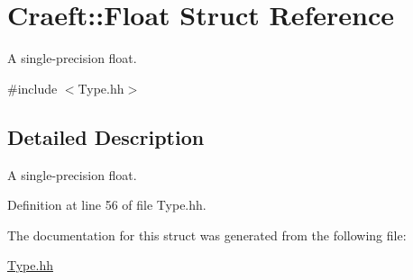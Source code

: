 \hypertarget{struct_craeft_1_1_float}{}\section{Craeft\+:\+:Float Struct Reference}
\label{struct_craeft_1_1_float}


A single-\/precision float.  




{\ttfamily \#include $<$Type.\+hh$>$}



\subsection{Detailed Description}
A single-\/precision float. 

Definition at line 56 of file Type.\+hh.



The documentation for this struct was generated from the following file\+:\begin{DoxyCompactItemize}
\item 
\hyperlink{_type_8hh}{Type.\+hh}\end{DoxyCompactItemize}
